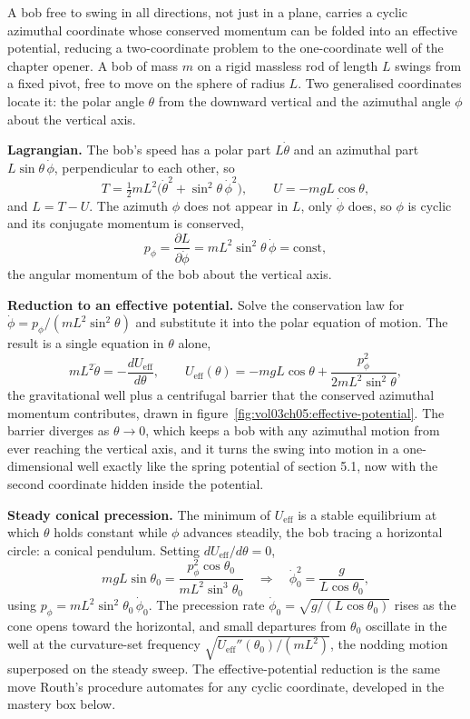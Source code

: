 A bob free to swing in all directions, not just in a plane, carries a cyclic
azimuthal coordinate whose conserved momentum can be folded into an effective
potential, reducing a two-coordinate problem to the one-coordinate well of the
chapter opener. A bob of mass $m$ on a rigid massless rod of length $L$ swings
from a fixed pivot, free to move on the sphere of radius $L$. Two generalised
coordinates locate it: the polar angle $\theta$ from the downward vertical and
the azimuthal angle $\phi$ about the vertical axis.

\textbf{Lagrangian.} The bob's speed has a polar part $L\dot\theta$ and an
azimuthal part $L\sin\theta\,\dot\phi$, perpendicular to each other, so
\[
T = \tfrac12 m L^2\bigl(\dot\theta^2 + \sin^2\theta\,\dot\phi^2\bigr),
\qquad
U = -mgL\cos\theta,
\]
and $L = T - U$. The azimuth $\phi$ does not appear in $L$, only $\dot\phi$
does, so $\phi$ is cyclic and its conjugate momentum is conserved,
\[
p_\phi = \frac{\partial L}{\partial\dot\phi}
       = mL^2\sin^2\theta\,\dot\phi = \text{const},
\]
the angular momentum of the bob about the vertical axis.

\textbf{Reduction to an effective potential.} Solve the conservation law for
$\dot\phi = p_\phi/(mL^2\sin^2\theta)$ and substitute it into the polar
equation of motion. The result is a single equation in $\theta$ alone,
\[
mL^2\ddot\theta = -\frac{dU_\text{eff}}{d\theta},
\qquad
U_\text{eff}(\theta) = -mgL\cos\theta
  + \frac{p_\phi^2}{2mL^2\sin^2\theta},
\]
the gravitational well plus a centrifugal barrier that the conserved azimuthal
momentum contributes, drawn in figure~\ref{fig:vol03ch05:effective-potential}.
The barrier diverges as $\theta\to 0$, which keeps a bob with any azimuthal
motion from ever reaching the vertical axis, and it turns the swing into
motion in a one-dimensional well exactly like the spring potential of section
5.1, now with the second coordinate hidden inside the potential.



\textbf{Steady conical precession.} The minimum of $U_\text{eff}$ is a stable
equilibrium at which $\theta$ holds constant while $\phi$ advances steadily,
the bob tracing a horizontal circle: a conical pendulum. Setting
$dU_\text{eff}/d\theta = 0$,
\[
mgL\sin\theta_0
= \frac{p_\phi^2\cos\theta_0}{mL^2\sin^3\theta_0}
\quad\Longrightarrow\quad
\dot\phi_0^2 = \frac{g}{L\cos\theta_0},
\]
using $p_\phi = mL^2\sin^2\theta_0\,\dot\phi_0$. The precession rate
$\dot\phi_0 = \sqrt{g/(L\cos\theta_0)}$ rises as the cone opens toward the
horizontal, and small departures from $\theta_0$ oscillate in the well at the
curvature-set frequency $\sqrt{U_\text{eff}''(\theta_0)/(mL^2)}$, the
nodding motion superposed on the steady sweep. The effective-potential
reduction is the same move Routh's procedure automates for any cyclic
coordinate, developed in the mastery box below.

